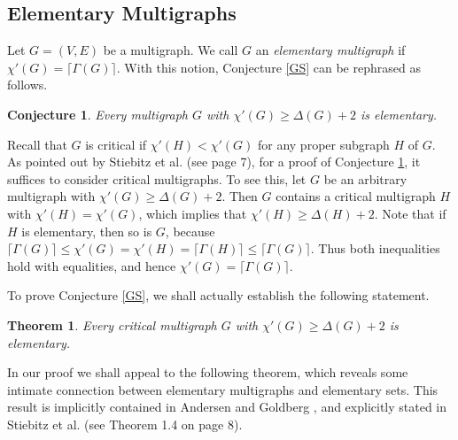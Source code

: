 \documentclass[11pt]{article}
\newtheorem{theorem}{Theorem}[section]
\newtheorem{conjecture}{Conjecture}[section]
\begin{document}
\subsection{Elementary Multigraphs}

Let $G=(V,E)$ be a multigraph. We call $G$ an {\em elementary multigraph}\label{elementarymulti} if $\chi'(G)=\lceil \Gamma(G) \rceil$.
With this notion, Conjecture \ref{GS} can be rephrased as follows.

\begin{conjecture} \label{GS2}
Every multigraph $G$ with $\chi'(G) \ge \Delta(G)+2$ is elementary.
\end{conjecture} 

Recall that $G$ is critical if $\chi'(H)<\chi'(G)$ for any proper subgraph $H$ of $G$. As pointed out by Stiebitz 
et al. \cite{SSTF} (see page 7), for a proof of Conjecture \ref{GS2}, it suffices to consider critical multigraphs. To 
see this, let $G$ be an arbitrary multigraph with $\chi'(G) \ge \Delta(G)+2$. Then $G$ contains a critical multigraph 
$H$ with $\chi'(H)=\chi'(G)$, which implies that $\chi'(H) \ge \Delta(H)+2$. Note that if $H$ is elementary, 
then so is $G$, because $\lceil \Gamma(G) \rceil \le \chi'(G) = \chi'(H) = \lceil \Gamma(H) \rceil \le 
\lceil \Gamma(G) \rceil$. Thus both inequalities hold with equalities, and hence $\chi'(G)=\lceil \Gamma(G) \rceil$.

To prove Conjecture \ref{GS}, we shall actually establish the following statement.

\begin{theorem} \label{ThmGS2} 
Every critical multigraph $G$ with $\chi'(G) \ge \Delta(G)+2$ is elementary.
\end{theorem}

In our proof we shall appeal to the following theorem, which reveals some intimate connection between elementary 
multigraphs and elementary sets. This result is implicitly contained in Andersen \cite{An77} and Goldberg \cite{G84}, 
and explicitly stated in Stiebitz et al. \cite{SSTF}  (see Theorem 1.4 on page 8).
\end{document}
